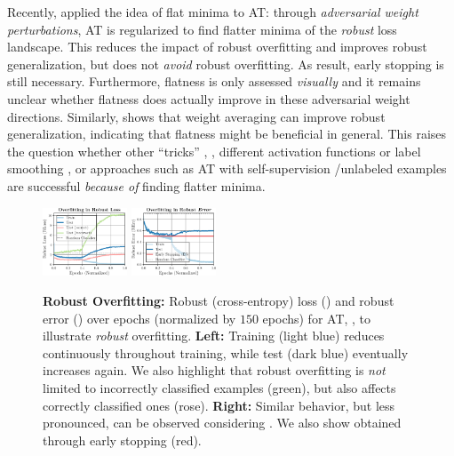 Recently, \cite{WuNIPS2020} applied the idea of flat minima to AT: through \emph{adversarial weight perturbations}, AT is regularized to find flatter minima of the \emph{robust} loss landscape. This reduces the impact of robust overfitting and improves robust generalization, but does not \emph{avoid} robust overfitting. As result, early stopping is still necessary. Furthermore, flatness is only assessed \emph{visually} and it remains unclear whether flatness does actually improve in these adversarial weight directions.
Similarly, \cite{GowalARXIV2020} shows that weight averaging \cite{IzmailovUAI2018} can improve robust generalization, indicating that flatness might be beneficial in general. This raises the question whether other ``tricks'' \cite{PangARXIV2020b,GowalARXIV2020}, \eg, different activation functions \cite{SinglaARXIV2021} or label smoothing \cite{SzegedyCVPR2016}, or approaches such as AT with self-supervision \cite{HendrycksNIPS2019}/unlabeled examples \cite{CarmonNIPS2019} are successful \emph{because of} finding flatter minima.

\begin{figure}[t]
	\centering
	\vspace*{-0.2cm}
	\includegraphics[width=0.225\textwidth]{plots_short_introduction_overfitting1}
	\includegraphics[width=0.225\textwidth]{plots_short_introduction_overfitting2}
	\vspace*{-8px}
	\caption{\textbf{Robust Overfitting:} Robust (cross-entropy) loss (\RCE) and robust error (\RTE) over epochs (normalized by $150$ epochs) for AT, , to illustrate \emph{robust} overfitting. \textbf{Left:} Training \RCE ({\color{plot0}light blue}) reduces continuously throughout training, while test \RCE ({\color{plot1}dark blue}) eventually increases again.
	We also highlight that robust overfitting is \emph{not} limited to incorrectly classified examples ({\color{plot4}green}), but also affects correctly classified ones ({\color{plot2}rose}). \textbf{Right:} Similar behavior, but less pronounced, can be observed considering \RTE. We also show \RTE obtained through early stopping ({\color{plot5}red}).}
	\label{fig:main-overfitting}
	\vspace*{-6px}
\end{figure}

